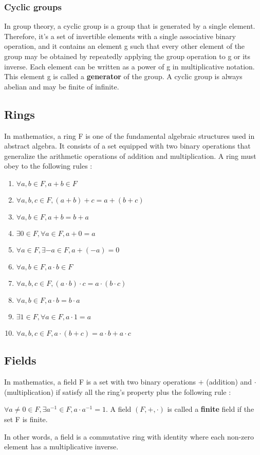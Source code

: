 \documentclass[11pt]{article}
\begin{document}
\subsubsection{Cyclic groups}
In group theory, a cyclic group is a group that is generated by a single element. Therefore, it's a set of invertible elements with a single associative binary operation, and it contains an element g such that every other element of the group may be obtained by repeatedly applying the group operation to g or its inverse. Each element can be written as a power of g in multiplicative notation. This element g is called a \textbf{generator} of the group. A cyclic group is always abelian and may be finite of infinite.
\subsection{Rings}
In mathematics, a ring F is one of the fundamental algebraic structures used in abstract algebra. It consists of a set equipped with two binary operations that generalize the arithmetic operations of addition and multiplication. A ring must obey to the following rules : 
\begin{enumerate}
\item $\forall a,b \in F, a+b \in F$
\item $\forall a,b,c \in F, (a+b)+c = a+(b+c)$
\item $\forall a,b \in F, a+b = b+a$
\item $\exists 0 \in F, \forall a \in F, a+0 = a$
\item $\forall a \in F, \exists -a \in F, a+(-a) = 0$
\item $\forall a,b \in F, a\cdot b \in F$
\item $\forall a,b,c \in F, (a\cdot b)\cdot c = a\cdot(b\cdot c)$
\item $\forall a,b \in F, a\cdot b = b \cdot a$
\item $\exists 1 \in F, \forall a \in F, a \cdot 1 = a$
\item $\forall a,b,c \in F, a\cdot(b+c) = a\cdot b + a\cdot c$
\end{enumerate}
\subsection{Fields}
In mathematics, a field F is a set with two binary operations $+$ (addition) and $\cdot$ (multiplication) if satisfy all the ring's property plus the following rule : 
\begin{center}
$\forall a \neq 0 \in F, \exists a^{-1} \in F, a \cdot a^{-1} = 1$. A field $(F, +, \cdot)$ is called a \textbf{finite} field if the set F is finite.
\end{center}
In other words, a field is a commutative ring with identity where each non-zero element has a multiplicative inverse.
\end{document}
